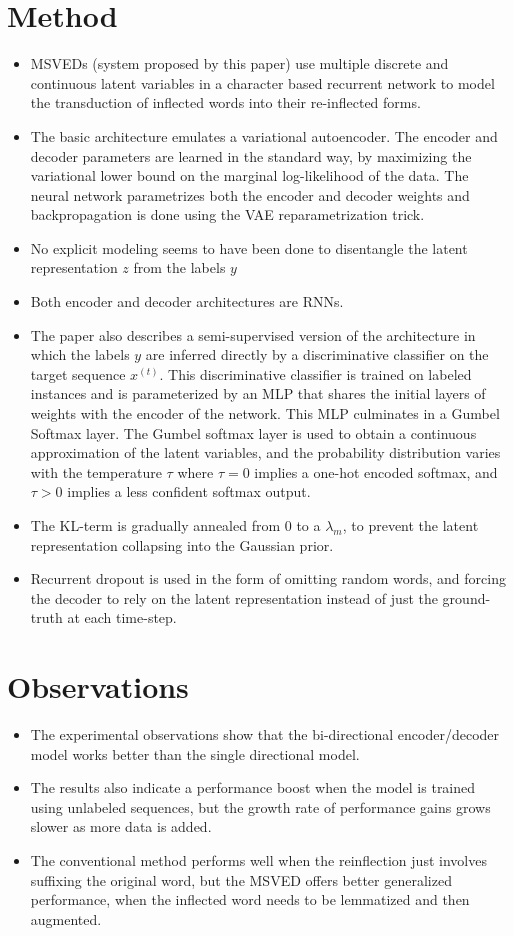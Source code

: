 \documentclass[12pt]{scrartcl}
\begin{document}
\section{Method}
  \begin{itemize}
    \item MSVEDs (system proposed by this paper) use multiple discrete and continuous latent variables in a character based recurrent network to model the transduction of inflected words into their re-inflected forms.
    \item The basic architecture emulates a variational autoencoder. The encoder and decoder parameters are learned in the standard way, by maximizing the variational lower bound on the marginal log-likelihood of the data. The neural network parametrizes both the encoder and decoder weights and backpropagation is done using the VAE reparametrization trick.
    \item No explicit modeling seems to have been done to disentangle the latent representation $z$ from the labels $y$
    \item Both encoder and decoder architectures are RNNs.
    \item The paper also describes a semi-supervised version of the architecture in which the labels $y$ are inferred directly by a discriminative classifier on the target sequence $x^{(t)}$. This discriminative classifier is trained on labeled instances and is parameterized by an MLP that shares the initial layers of weights with the encoder of the network. This MLP culminates in a Gumbel Softmax layer. The Gumbel softmax layer is used to obtain a continuous approximation of the latent variables, and the probability distribution varies with the temperature $\tau$ where $\tau = 0$ implies a one-hot encoded softmax, and $\tau > 0$ implies a less confident softmax output.
    \item The KL-term is gradually annealed from 0 to a $\lambda_m$, to prevent the latent representation collapsing into the Gaussian prior.
    \item Recurrent dropout is used in the form of omitting random words, and forcing the decoder to rely on the latent representation instead of just the ground-truth at each time-step.
  \end{itemize}

\section{Observations}
  \begin{itemize}
    \item The experimental observations show that the bi-directional encoder/decoder model works better than the single directional model.
    \item The results also indicate a performance boost when the model is trained using unlabeled sequences, but the growth rate of performance gains grows slower as more data is added.
    \item The conventional method performs well when the reinflection just involves suffixing the original word, but the MSVED offers better generalized performance, when the inflected word needs to be lemmatized and then augmented.
  \end{itemize}



\end{document}
